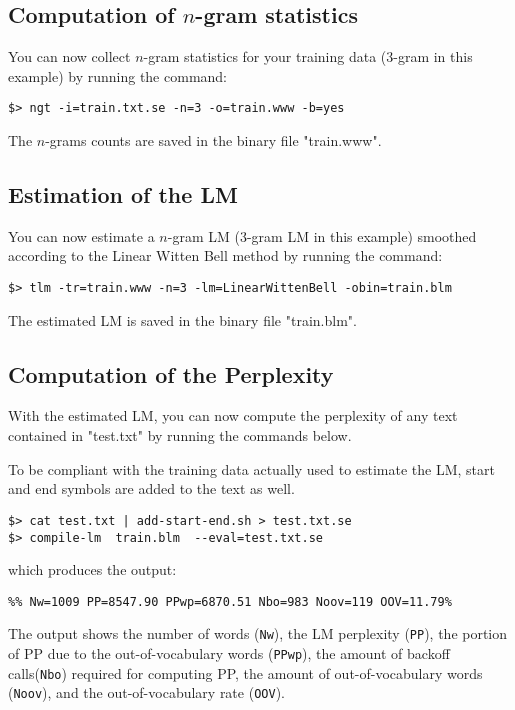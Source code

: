 \subsection{Computation of $n$-gram statistics}
\noindent
You can now collect $n$-gram statistics for your training data (3-gram in this example) by running the command:

\begin{verbatim}
$> ngt -i=train.txt.se -n=3 -o=train.www -b=yes
\end{verbatim}

\noindent
The $n$-grams counts are saved in the binary file "train.www".


\subsection{Estimation of the LM}
\noindent
You can now estimate a $n$-gram LM (3-gram LM in this example) smoothed according to the Linear Witten Bell method by running the command:

\begin{verbatim}
$> tlm -tr=train.www -n=3 -lm=LinearWittenBell -obin=train.blm
\end{verbatim}
\noindent
The estimated LM is saved in the binary file "train.blm".


\subsection{Computation of the Perplexity}
\noindent
With the estimated LM, you can now compute the perplexity of any text contained in "test.txt" by running the commands below.

\noindent
To be compliant with the training data actually used to estimate the LM, start and end symbols are added to the text as well.

\begin{verbatim}
$> cat test.txt | add-start-end.sh > test.txt.se
$> compile-lm  train.blm  --eval=test.txt.se
\end{verbatim}

\noindent
which produces the output:
\begin{verbatim}
%% Nw=1009 PP=8547.90 PPwp=6870.51 Nbo=983 Noov=119 OOV=11.79%
\end{verbatim}

\noindent
The output shows the number of  words ({\tt Nw}), the LM perplexity ({\tt PP}), the portion of PP due to the out-of-vocabulary words ({\tt PPwp}), the amount of backoff calls({\tt Nbo}) required for computing PP, the amount of out-of-vocabulary words ({\tt Noov}), and the out-of-vocabulary rate ({\tt OOV}).


